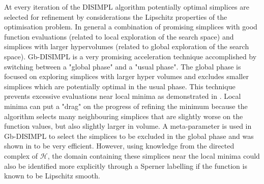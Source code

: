 At every iteration of the DISIMPL algorithm potentially optimal simplices are selected for refinement by considerations the Lipschitz properties of the optimisation problem. In general a combination of promising simplices with good function evaluations (related to local exploration of the search space) and simplices with larger hypervolumes (related to global exploration of the search space). Gb-DISIMPL \citep{Paul2014a} is a very promising acceleration technique accomplished by switching between a "global phase" and a "usual phase". The global phase is focused on exploring simplices with larger hyper volumes and excludes smaller simplices which are potentially optimal in the usual phase. This technique prevents excessive evaluations near local minima as demonstrated in \citet{Paul2014a}. Local minima can put a "drag" on the progress of refining the minimum because the algorithm selects many neighbouring simplices that are slightly worse on the function values, but also slightly larger in volume. A meta-parameter is used in Gb-DISIMPL to select the simplices to be excluded in the global phase and was shown in \citet{Paul2014a} to be very efficient. However, using knowledge from the directed complex of $\mathcal{H}$, the domain containing these simplices near the local minima could also be identified more explicitly through a Sperner labelling if the function is known to be Lipschitz smooth.







